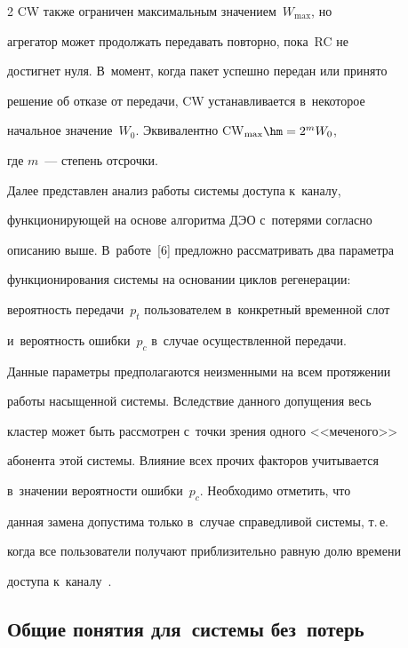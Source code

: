 \begin{multicols}{2}
CW также ограничен максимальным значением~$W_{\max}$, но 


агрегатор может продолжать передавать повторно, пока~RC не 


достигнет нуля. В~момент, когда пакет успешно передан или принято 


решение об отказе от передачи, CW устанавливается в~некоторое 


начальное значение~$W_0$. Эквивалентно CW$_{\max}\hm= 2^m W_0$, 


где $m$~--- степень отсрочки.


    


    Далее представлен анализ работы системы доступа к~каналу, 


функционирующей на основе алгоритма ДЭО с~потерями согласно 


описанию выше. В~работе~[6] предложно рассматривать два параметра 


функционирования системы на основании циклов регенерации: 


вероятность передачи~$p_t$ пользователем в~конкретный временной слот 


и~вероятность ошибки~$p_c$ в~случае осуществленной передачи. 


Данные параметры предполагаются неизменными на всем протяжении 


работы насыщенной системы. Вследствие данного допущения весь 


кластер может быть рассмотрен с~точки зрения одного <<меченого>> 


абонента этой системы. Влияние всех прочих факторов учитывается 


в~значении вероятности ошибки~$p_c$. Необходимо отметить, что 


данная замена допустима только в~случае справедливой системы, т.\,е.\ 


когда все пользователи получают приблизительно равную долю времени 


доступа к~каналу~\cite{7-om}.





    


\subsection{Общие понятия для~системы без~потерь}


    



\end{multicols}
